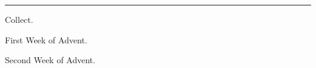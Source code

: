 {  
  \subtitle{\small{Thursday.}}
  {
  \def\noeuouae{T}
  }
  \medskip
  \hrule
  \medskip
  {
      \label{vr-rorate-dec8}
      \newcommand{\commvlatin}{Roráte cæli désuper, et nubes pluant \textbf{ju}stum.}
      \newcommand{\commrlatin}{Aperiátur terra, et gérminet Salva\textbf{tó}rem.}
      \newcommand{\commvtranslation}{Ye heavens, drop down dew from above, and let the clouds rain down the Just One.}
      \newcommand{\commrtranslation}{Let the earth open and bud forth the Saviour.}
  \printvrcommem{}
  }

  \label{collect-dec8}
  \bigskip
  {\centering\large Collect.\par}
  \def\printcollectheading{F}
  {
  {\centering{}First Week of Advent.\par}
  \def\gabcfolder{../Advent1}
  
  \printcollect{\collect}{\collecttranslation}
  }
  {
  \bigskip
  {\centering{}Second Week of Advent.\par}
  \medskip
  \def\gabcfolder{../Advent2}
  
  \printcollect{\latincomcollect}{\englishcomcollect}
  }

  \bigskip
  \benedicamusdomino{}
}
